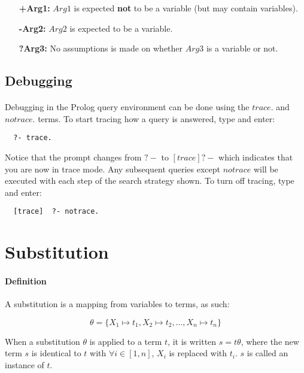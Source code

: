 \documentclass{article}
\begin{document}
\begin{multicols}{2}
  \begin{enumerate}
  \item[\bf +Arg1:] $Arg1$ is expected {\bf not} to be a variable (but may contain variables).
  \item[\bf -Arg2:] $Arg2$ is expected to be a variable.
  \item[\bf ?Arg3:] No assumptions is made on whether $Arg3$ is a variable or not.
  \end{enumerate}
  
  \subsection{Debugging}
  
  \paragraph{} Debugging in the Prolog query environment can be done using the $trace.$ and $notrace.$ terms. To start tracing how a query is answered, type and enter:
  
  \begin{lstlisting}
  ?- trace.
  \end{lstlisting}
  
  Notice that the prompt changes from $?-$ to $[trace]  ?-$ which indicates that you are now in trace mode. Any subsequent queries except $notrace$ will be executed with each step of the search strategy shown. To turn off tracing, type and enter:
  
  \begin{lstlisting}
  [trace]  ?- notrace.
  \end{lstlisting}
  
  \section{Substitution}
  
  \paragraph{Definition} A substitution is a mapping from variables to terms, as such:
  
  $$\theta = \{ X_1 \mapsto t_1, X_2 \mapsto t_2, ..., X_n \mapsto t_n \}$$
  
  When a substitution $\theta$ is applied to a term $t$, it is written $s = t\theta$, where the new term $s$ is identical to $t$ with $\forall i \in [1, n]$, $X_i$ is replaced with $t_i$. $s$ is called an instance of $t$.
  

\end{multicols}
\end{document}
